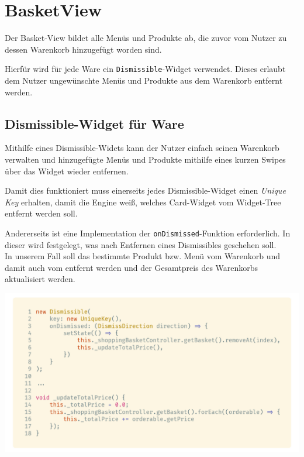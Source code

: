 \section{BasketView}
\label{basketview}

Der Basket-View bildet alle Menüs und Produkte ab, die zuvor vom Nutzer zu dessen Warenkorb hinzugefügt
worden sind.

Hierfür wird für jede Ware ein \lstinline{Dismissible}-Widget verwendet. Dieses erlaubt dem Nutzer
ungewünschte Menüs und Produkte aus dem Warenkorb entfernt werden.
\cite{flutterDismissible}

\subsection{Dismissible-Widget für Ware}

Mithilfe eines Dismissible-Widets kann der Nutzer einfach seinen Warenkorb verwalten und hinzugefügte
Menüs und Produkte mithilfe eines kurzen Swipes über das Widget wieder entfernen.

Damit dies funktioniert muss einerseits jedes Dismissible-Widget einen \textit{Unique Key} erhalten,
damit die Engine weiß, welches Card-Widget vom Widget-Tree entfernt werden soll.

Andererseits ist eine Implementation der \lstinline{onDismissed}-Funktion erforderlich. In dieser
wird festgelegt, was nach Entfernen eines Dismissibles geschehen soll.\\
In unserem Fall soll das bestimmte Produkt bzw. Menü vom Warenkorb und damit auch vom
 entfernt werden und der Gesamtpreis des Warenkorbs aktualisiert werden.

\begin{code}[H]
    \centering
    \includegraphics[width=1\textwidth]{images/Client/views/basketview/dismissible.png}
    \vspace{-20pt}
    \caption{Dismissible-Widget im Basket-View mit \lstinline{_updateTotalPrice}-Funktion zum Aktualisieren des Gesamtpreises}
    \label{dismissible}
\end{code}

